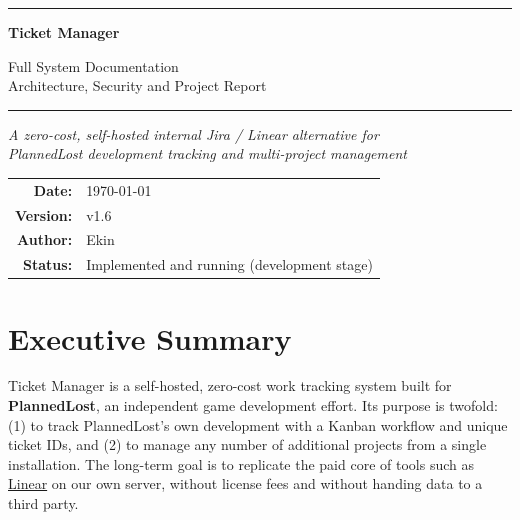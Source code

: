 \documentclass[11pt,a4paper]{article}
\begin{document}
\begin{titlepage}
\centering
\vspace*{2cm}
{\color{accent}\rule{0.6\textwidth}{1pt}}
\vspace{0.8cm}

{\Huge \bfseries Ticket Manager\par}

\vspace{0.4cm}
{\Large \color{darkgray} Full System Documentation\\ Architecture, Security and Project Report\par}

\vspace{0.8cm}
{\color{accent}\rule{0.6\textwidth}{1pt}}
\vspace{1.2cm}

{\large \itshape A zero-cost, self-hosted internal Jira / Linear alternative for\\
PlannedLost development tracking and multi-project management\par}

\vspace{2cm}
{\normalsize
\begin{tabular}{rl}
\textbf{Date:}      & \today \\
\textbf{Version:}   & v1.6 \\
\textbf{Author:}    & Ekin \\
\textbf{Status:}    & Implemented and running (development stage) \\
\end{tabular}\par}
\vfill
\end{titlepage}

\tableofcontents
\newpage
{}

\section{Executive Summary}

Ticket Manager is a self-hosted, zero-cost work tracking system built for
\textbf{PlannedLost}, an independent game development effort. Its purpose is
twofold: (1) to track PlannedLost's own development with a Kanban workflow and
unique ticket IDs, and (2) to manage any number of additional projects from a
single installation. The long-term goal is to replicate the paid core of tools
such as \href{https://linear.app/}{Linear} on our own server, without license
fees and without handing data to a third party.
\end{document}
